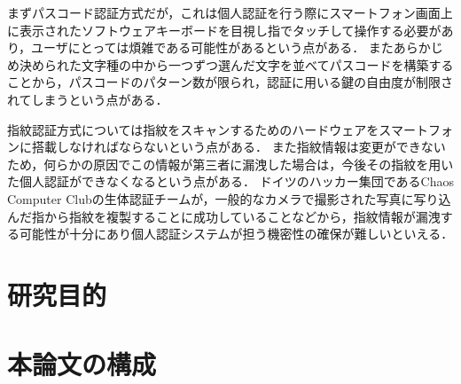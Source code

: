まずパスコード認証方式だが，これは個人認証を行う際にスマートフォン画面上に表示されたソフトウェアキーボードを目視し指でタッチして操作する必要があり，ユーザにとっては煩雑である可能性があるという点がある．
またあらかじめ決められた文字種の中から一つずつ選んだ文字を並べてパスコードを構築することから，パスコードのパターン数が限られ，認証に用いる鍵の自由度が制限されてしまうという点がある．

指紋認証方式については指紋をスキャンするためのハードウェアをスマートフォンに搭載しなければならないという点がある．
また指紋情報は変更ができないため，何らかの原因でこの情報が第三者に漏洩した場合は，今後その指紋を用いた個人認証ができなくなるという点がある．
ドイツのハッカー集団であるChaos Computer Clubの生体認証チームが，一般的なカメラで撮影された写真に写り込んだ指から指紋を複製することに成功している\cite{1-ccc}ことなどから，指紋情報が漏洩する可能性が十分にあり個人認証システムが担う機密性の確保が難しいといえる\cite{1-sophos}．

\section{研究目的}

\section{本論文の構成}
